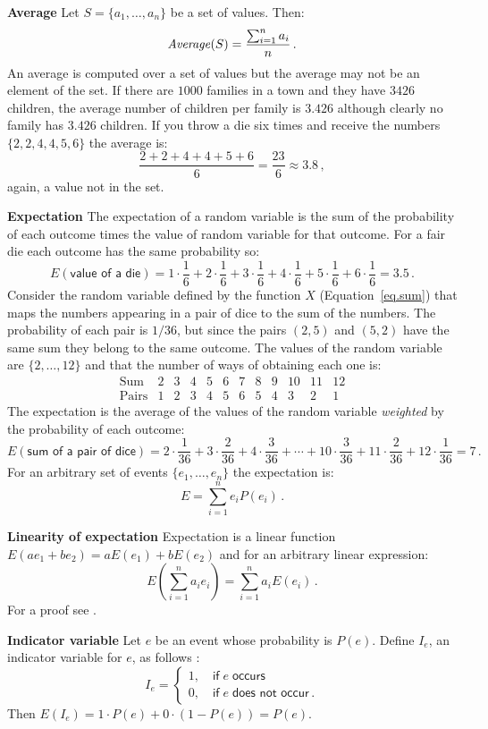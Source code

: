 \textbf{Average}
Let $S=\{a_1,\ldots,a_n\}$ be a set of values. Then:
\[
\mathit{Average}(S)=\displaystyle\frac{\sum_{i=1}^{n} a_i}{n}\,.
\]
An average is computed over a set of values but the average may not be an element of the set. If there are $1000$ families in a town and they have $3426$ children, the average number of children per family is $3.426$ although clearly no family has $3.426$ children. If you throw a die six times and receive the numbers $\{2,2,4,4,5,6\}$ the average is:
\[
\frac{2+2+4+4+5+6}{6}=\frac{23}{6}\approx 3.8\,,
\]
again, a value not in the set.

\textbf{Expectation}
The expectation of a random variable is the sum of the probability of each outcome times the value of random variable for that outcome. For a fair die each outcome has the same probability so:
\[
E(\textsf{value of a die})=1\cdot \frac{1}{6} + 2\cdot\frac{1}{6} + 3\cdot\frac{1}{6} + 4\cdot\frac{1}{6} + 5\cdot\frac{1}{6} + 6\cdot\frac{1}{6}=3.5\,.
\]
Consider the random variable defined by the function $X$ (Equation~\ref{eq.sum}) that maps the numbers appearing in a pair of dice to the sum of the numbers. The probability of each pair is $1/36$, but since the pairs $(2,5)$ and $(5,2)$ have the same sum they belong to the same outcome. The values of the random variable are $\{2,\ldots,12\}$ and that the number of ways of obtaining each one is:
\[
\begin{array}{l|rrrrrrrrrrr}
\textrm{Sum} & 2 & 3 & 4 & 5 & 6 & 7 & 8 & 9 & 10 & 11 & 12\\\hline
\textrm{Pairs} & 1 & 2 & 3 & 4 & 5 & 6 & 5 & 4 & 3 & 2 & 1
\end{array}
\]
The expectation is the average of the values of the random variable \emph{weighted} by the probability of each outcome:
\[
E(\textsf{sum of a pair of dice})=2\cdot \frac{1}{36} + 3\cdot \frac{2}{36} + 4\cdot \frac{3}{36} + 
\cdots + 10\cdot \frac{3}{36} + 11\cdot \frac{2}{36} + 12\cdot \frac{1}{36} = 7\,.
\]
For an arbitrary set of events $\{e_1,\ldots,e_n\}$ the expectation is:
\[
E=\sum_{i=1}^{n} e_iP(e_i)\,.
\]

\textbf{Linearity of expectation}\label{p.linearity}
Expectation is a linear function $E(ae_1 + be_2) = aE(e_1) + bE(e_2)$ and for an arbitrary linear expression:
\[
E\left(\sum_{i=1}^{n} a_ie_i\right)=\sum_{i=1}^{n} a_iE(e_i)\,.
\]
For a proof see \cite[Section~4.9]{ross}.

\textbf{Indicator variable} Let $e$ be an event whose probability is $P(e)$. Define $I_e$, an indicator variable for $e$, as follows \cite[Chapter~4, Example~3b]{ross}:
\[
I_e=
\left\{
\begin{array}{ll}
1,\quad \textsf{if}\; e\;\textsf{occurs}\\
0, \quad \textsf{if}\;e\;\textsf{does not occur}\,.
\end{array}
\right.
\]
Then $E(I_e)=1\cdot P(e) + 0\cdot (1-P(e))=P(e)$.

